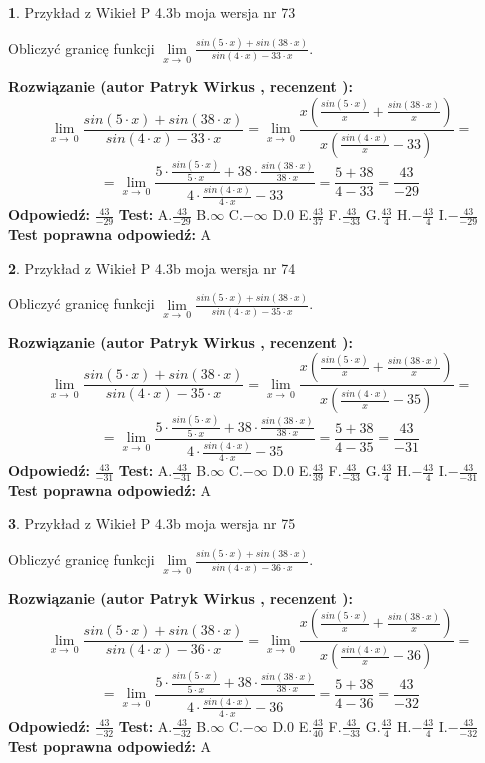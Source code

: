 \documentclass[12pt, a4paper]{article}
\theoremstyle{definition} %
\newtheorem{zad}{}
\newcommand{\zadStart}[1]{\begin{zad}#1\newline}
\newcommand{\zadStop}{\end{zad}}
\newcommand{\rozwStart}[2]{\noindent \textbf{Rozwiązanie (autor #1 , recenzent #2): }\newline}
\newcommand{\rozwStop}{\newline}
\newcommand{\odpStart}{\noindent \textbf{Odpowiedź:}\newline}
\newcommand{\odpStop}{\newline}
\newcommand{\testStart}{\noindent \textbf{Test:}\newline}
\newcommand{\testStop}{\newline}
\newcommand{\kluczStart}{\noindent \textbf{Test poprawna odpowiedź:}\newline}
\newcommand{\kluczStop}{\newline}
\begin{document}
\zadStart{Przykład z Wikieł P 4.3b moja wersja nr 73}


Obliczyć granicę funkcji $\lim\limits_{x\to\ 0}\frac{sin(5 \cdot x)+sin(38 \cdot x)}{sin(4 \cdot x)-33 \cdot x}$.
\zadStop
\rozwStart{Patryk Wirkus}{}
$$\lim\limits_{x\to\ 0}\frac{sin(5 \cdot x)+sin(38 \cdot x)}{sin(4 \cdot x)-33 \cdot x}=\lim\limits_{x\to\ 0}\frac{x(\frac{sin(5 \cdot x)}{x}+\frac{sin(38 \cdot x)}{x})}{x(\frac{sin(4 \cdot x)}{x}-33)}=$$
$$=\lim\limits_{x\to\ 0}\frac{5 \cdot \frac{sin(5 \cdot x)}{5 \cdot x}+38 \cdot \frac{sin(38 \cdot x)}{38 \cdot x}}{4 \cdot \frac{sin(4 \cdot x)}{4 \cdot x}-33}=\frac{5+38}{4-33} = \frac{43}{-29}$$
\rozwStop
\odpStart
$\frac{43}{-29}$
\odpStop
\testStart
A.$\frac{43}{-29}$
B.$\infty$
C.$-\infty$
D.$0$
E.$\frac{43}{37}$
F.$\frac{43}{-33}$
G.$\frac{43}{4}$
H.$-\frac{43}{4}$
I.$-\frac{43}{-29}$
\testStop
\kluczStart
A
\kluczStop



\zadStart{Przykład z Wikieł P 4.3b moja wersja nr 74}


Obliczyć granicę funkcji $\lim\limits_{x\to\ 0}\frac{sin(5 \cdot x)+sin(38 \cdot x)}{sin(4 \cdot x)-35 \cdot x}$.
\zadStop
\rozwStart{Patryk Wirkus}{}
$$\lim\limits_{x\to\ 0}\frac{sin(5 \cdot x)+sin(38 \cdot x)}{sin(4 \cdot x)-35 \cdot x}=\lim\limits_{x\to\ 0}\frac{x(\frac{sin(5 \cdot x)}{x}+\frac{sin(38 \cdot x)}{x})}{x(\frac{sin(4 \cdot x)}{x}-35)}=$$
$$=\lim\limits_{x\to\ 0}\frac{5 \cdot \frac{sin(5 \cdot x)}{5 \cdot x}+38 \cdot \frac{sin(38 \cdot x)}{38 \cdot x}}{4 \cdot \frac{sin(4 \cdot x)}{4 \cdot x}-35}=\frac{5+38}{4-35} = \frac{43}{-31}$$
\rozwStop
\odpStart
$\frac{43}{-31}$
\odpStop
\testStart
A.$\frac{43}{-31}$
B.$\infty$
C.$-\infty$
D.$0$
E.$\frac{43}{39}$
F.$\frac{43}{-33}$
G.$\frac{43}{4}$
H.$-\frac{43}{4}$
I.$-\frac{43}{-31}$
\testStop
\kluczStart
A
\kluczStop



\zadStart{Przykład z Wikieł P 4.3b moja wersja nr 75}


Obliczyć granicę funkcji $\lim\limits_{x\to\ 0}\frac{sin(5 \cdot x)+sin(38 \cdot x)}{sin(4 \cdot x)-36 \cdot x}$.
\zadStop
\rozwStart{Patryk Wirkus}{}
$$\lim\limits_{x\to\ 0}\frac{sin(5 \cdot x)+sin(38 \cdot x)}{sin(4 \cdot x)-36 \cdot x}=\lim\limits_{x\to\ 0}\frac{x(\frac{sin(5 \cdot x)}{x}+\frac{sin(38 \cdot x)}{x})}{x(\frac{sin(4 \cdot x)}{x}-36)}=$$
$$=\lim\limits_{x\to\ 0}\frac{5 \cdot \frac{sin(5 \cdot x)}{5 \cdot x}+38 \cdot \frac{sin(38 \cdot x)}{38 \cdot x}}{4 \cdot \frac{sin(4 \cdot x)}{4 \cdot x}-36}=\frac{5+38}{4-36} = \frac{43}{-32}$$
\rozwStop
\odpStart
$\frac{43}{-32}$
\odpStop
\testStart
A.$\frac{43}{-32}$
B.$\infty$
C.$-\infty$
D.$0$
E.$\frac{43}{40}$
F.$\frac{43}{-33}$
G.$\frac{43}{4}$
H.$-\frac{43}{4}$
I.$-\frac{43}{-32}$
\testStop
\kluczStart
A
\kluczStop
\end{document}
